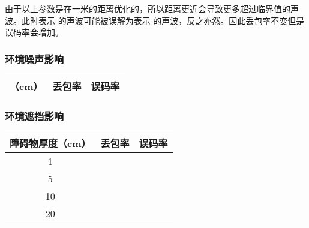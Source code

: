 由于以上参数是在一米的距离优化的，所以距离更近会导致更多超过临界值的声波。此时表示  的声波可能被误解为表示  的声波，反之亦然。因此丢包率不变但是误码率会增加。

\subsubsection{环境噪声影响}

\begin{table}[h!]
    \centering
    \begin{tabular}{ccc}\toprule
        （cm）& 丢包率 & 误码率 \\\midrule
        \bottomrule
    \end{tabular}
\end{table}

\subsubsection{环境遮挡影响}

\begin{table}[h!]
    \centering
    \begin{tabular}{ccc}\toprule
        障碍物厚度（cm）& 丢包率 & 误码率 \\\midrule
        1 & & \\\midrule
        5 & & \\\midrule
        10 & & \\\midrule
        20 & & \\\midrule
        \bottomrule
    \end{tabular}
\end{table}
